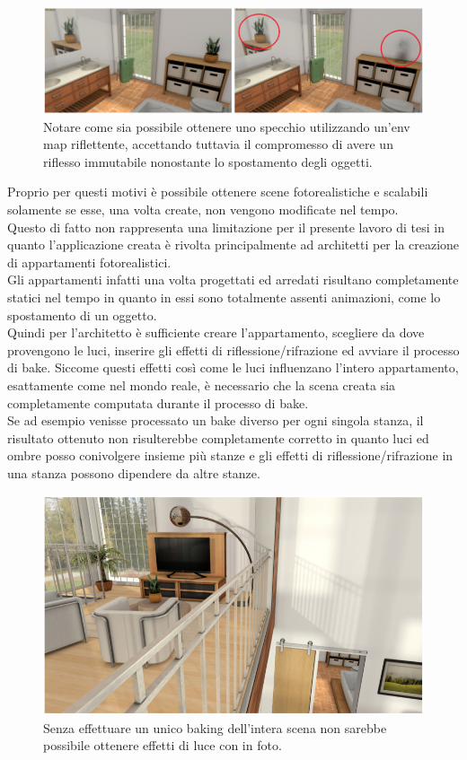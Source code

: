 \\
\begin{figure}[htb]
 \centering
 \includegraphics[width=0.8\linewidth]{images/chapter_lrl/lrl_appl2.png}\hfill
 \caption[Applicabilità, riflesso con env map]{Notare come sia possibile ottenere uno specchio utilizzando un'env map riflettente, accettando tuttavia il compromesso di avere un riflesso immutabile nonostante lo spostamento degli oggetti.}
 \label{fig:lrl_appl2}
\end{figure}
Proprio per questi motivi è possibile ottenere scene fotorealistiche e scalabili solamente se esse, una volta create, non vengono modificate nel tempo.
\\
Questo di fatto non rappresenta una limitazione per il presente lavoro di tesi in quanto l’applicazione creata è rivolta principalmente ad architetti per la creazione di appartamenti fotorealistici.
\\
Gli appartamenti infatti una volta progettati ed arredati risultano completamente statici nel tempo in quanto in essi sono totalmente assenti animazioni, come lo spostamento di un oggetto.
\\
Quindi per l’architetto è sufficiente creare l’appartamento, scegliere da dove provengono le luci, inserire gli effetti di riflessione/rifrazione ed avviare il processo di bake.
Siccome questi effetti così come le luci influenzano l’intero appartamento, esattamente come nel mondo reale, è necessario che la scena creata sia completamente computata durante il processo di bake. 
\\
Se ad esempio venisse processato un bake diverso per ogni singola stanza, il risultato ottenuto non risulterebbe completamente corretto in quanto luci ed ombre posso conivolgere insieme più stanze e gli effetti di riflessione/rifrazione in una stanza possono dipendere da altre stanze.
\\
\begin{figure}[htb]
 \centering
 \includegraphics[width=0.8\linewidth]{images/chapter_lrl/lrl_appl3.png}\hfill
 \caption[Applicabilità, scene autocontenute]{Senza effettuare un unico baking dell'intera scena non sarebbe possibile ottenere effetti di luce con in foto.}
 \label{fig:lrl_appl3}
\end{figure}
